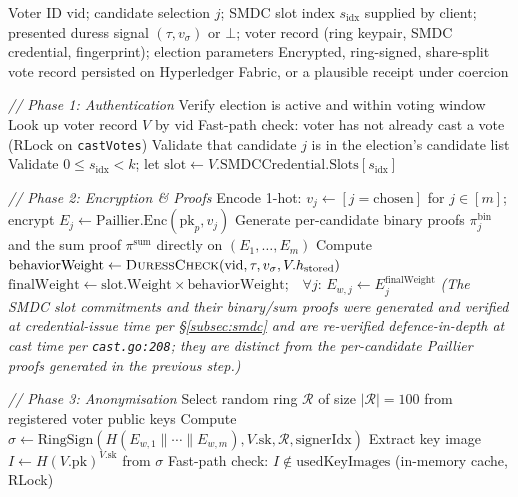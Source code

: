 \begin{algorithm}[H]
\caption{Proposed 20-Step Vote Casting Pipeline (mirrors \texttt{internal/voting/cast.go})}
\label{alg:pipeline}
\begin{algorithmic}[1]
\Require Voter ID $\text{vid}$; candidate selection $j$; SMDC slot index $s_{\text{idx}}$ supplied by client; presented duress signal $(\tau, v_{\sigma})$ or $\bot$; voter record (ring keypair, SMDC credential, fingerprint); election parameters
\Ensure Encrypted, ring-signed, share-split vote record persisted on Hyperledger Fabric, or a plausible receipt under coercion

\Statex \textit{// Phase 1: Authentication}
\State Verify election is active and within voting window
\State Look up voter record $V$ by $\text{vid}$
\State Fast-path check: voter has not already cast a vote (RLock on \texttt{castVotes})
\State Validate that candidate $j$ is in the election's candidate list
\State Validate $0 \le s_{\text{idx}} < k$; let $\text{slot} \gets V.\text{SMDCCredential.Slots}[s_{\text{idx}}]$

\Statex \textit{// Phase 2: Encryption \& Proofs}
\State Encode 1-hot: $v_j \gets [j = \text{chosen}]$ for $j \in [m]$; encrypt $E_j \gets \text{Paillier.Enc}(\text{pk}_p, v_j)$ 
\State Generate per-candidate binary proofs $\pi^{\text{bin}}_j$ and the sum proof $\pi^{\text{sum}}$ directly on $(E_1, \ldots, E_m)$ 
\State Compute $\text{behaviorWeight} \gets \textsc{DuressCheck}(\text{vid}, \tau, v_{\sigma}, V.h_{\text{stored}})$ 
\State $\text{finalWeight} \gets \text{slot.Weight} \times \text{behaviorWeight}$;\ \ $\forall j:\, E_{w,j} \gets E_j^{\text{finalWeight}}$ 
\Statex \textit{(The SMDC slot commitments and their binary/sum proofs were generated and verified at credential-issue time per \S\ref{subsec:smdc} and are re-verified defence-in-depth at cast time per \texttt{cast.go:208}; they are distinct from the per-candidate Paillier proofs generated in the previous step.)}

\Statex \textit{// Phase 3: Anonymisation}
\State Select random ring $\mathcal{R}$ of size $|\mathcal{R}| = 100$ from registered voter public keys
\State Compute $\sigma \gets \text{RingSign}(H(E_{w,1} \| \cdots \| E_{w,m}), V.\text{sk}, \mathcal{R}, \text{signerIdx})$ 
\State Extract key image $I \gets H(V.\text{pk})^{V.\text{sk}}$ from $\sigma$
\State Fast-path check: $I \notin \text{usedKeyImages}$ (in-memory cache, RLock)


\end{algorithmic}
\end{algorithm}
